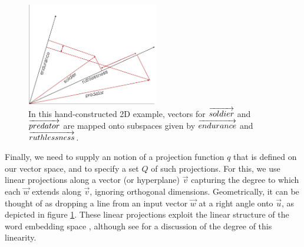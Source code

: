 \documentclass[9pt,twocolumn,twoside,lineno]{pnas-new}
\newcommand{\Listener}{L}
\newcommand{\QLONE}{\Listener_{{1}}^{{Q}}}
\begin{document}
		\begin{figure}
		\centering
			\includegraphics[height=4.5cm]{images/diagram2.png}
			\caption{In this hand-constructed 2D example, vectors for $\protect\overrightarrow{soldier}$ and $\protect\overrightarrow{predator}$ are mapped onto subspaces given by $\protect\overrightarrow{endurance}$ and $\protect\overrightarrow{ruthlessness}$.}
			\label{fig:1}
		\end{figure}

		Finally, we need to supply an notion of a projection function $q$ that is defined on our vector space, and to specify a set $Q$ of such projections. 
		For this, we use linear projections
		along a vector (or hyperplane) $\overrightarrow{v}$ 
		capturing the degree to which each $\overrightarrow{w}$ extends along $\overrightarrow{v}$, ignoring orthogonal dimensions. Geometrically, it can be thought of as dropping a line from an input vector $\overrightarrow{w}$ at a right angle onto $\overrightarrow{u}$, as depicted in figure \ref{fig:1}. These linear projections exploit the linear structure of the word embedding space \cite{pennington2014glove}, although see \cite{linzen2016issues,finley2017analogies} for a discussion of the degree of this linearity.
\end{document}
